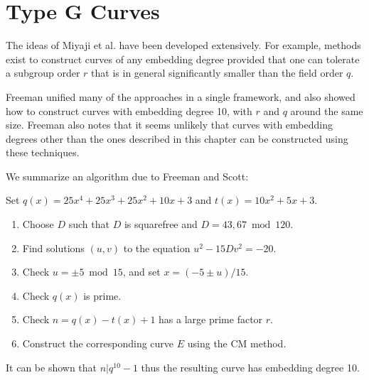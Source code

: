 \section { Type G Curves }

The ideas of Miyaji et al. have been developed extensively\cite{alotofstuff}.
For example, methods exist to construct curves of any embedding degree
provided that one can tolerate a subgroup order $r$ that is
in general significantly smaller than the field order $q$.

Freeman unified many of the approaches in a single
framework\cite{freeman}, and also showed how to construct curves with
embedding degree 10, with $r$ and $q$ around the same size.
Freeman also notes that it seems unlikely that curves
with embedding degrees other than the ones described in this chapter
can be constructed using these techniques.

We summarize an algorithm due to Freeman and Scott:

Set $q(x) = 25x^4 + 25x^3 + 25x^2 + 10x + 3$ and
$t(x) = 10x^2 + 5x + 3$.

\begin{enumerate}
\item
Choose $D$ such that $D$ is squarefree and $D = 43, 67 \bmod 120$.
\item
Find solutions $(u,v)$ to the equation $u^2 - 15 Dv^2 = -20$.
\item
Check $u = \pm 5 \bmod 15$,
and set $x = (-5 \pm u)/15$.
\item
Check $q(x)$ is prime.
\item
Check $n = q(x) - t(x) + 1$ has a large prime factor $r$.
\item
Construct the corresponding curve $E$ using the CM method.
\end{enumerate}

It can be shown that $n | q^{10} - 1$ thus the resulting curve has
embedding degree 10.
